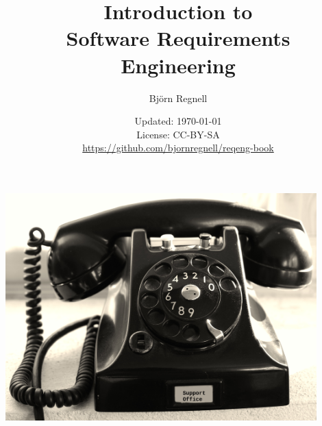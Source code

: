 \documentclass{reqengbook}
\title{
\bf\sffamily\fontsize{25}{30}\selectfont
Introduction to\\Software Requirements Engineering
}
\author{\sffamily\fontsize{20}{30}\selectfont Björn Regnell}
\date{\vspace{2em}\sffamily\small Updated: \today 
\\ License: CC-BY-SA 
\\ \url{https://github.com/bjornregnell/reqeng-book} 
}
\begin{document}

\begin{minipage}{0.5\textwidth}
  \maketitle%
\end{minipage}%
\begin{minipage}{0.5\textwidth}
  \centering\vspace{2.2cm}
  \includegraphics[width=0.9\textwidth]{../img/phone-support.jpg}%
\end{minipage}%
\pagebreak

\setcounter{tocdepth}{2}

\begin{multicols*}{2}  %
\tableofcontents
\end{multicols*}



\end{document}
